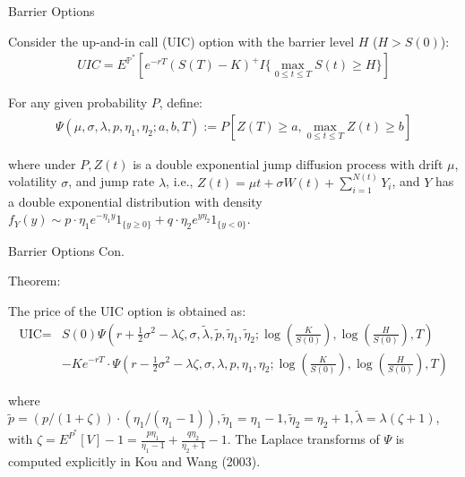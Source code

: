 \documentclass{beamer}
\begin{document}
\begin{frame}{Barrier Options}


    {\footnotesize \footnotesize
    \par Consider the up-and-in call (UIC) option with the barrier level $H$ ($H>S(0)$):
    \vspace{1em}
    \begin{align*}
        UIC = E^{\mathbb{P}^*}[e^{-rT}(S(T) - K)^+I{\{ \max\limits_{0 \leq t \leq T} S(t) \geq H \}}]
    \end{align*}
    \vspace{1em}
    \par For any given probability \( P \), define:
    \vspace{1em}
    \begin{align*}
        \Psi(\mu, \sigma, \lambda, p, \eta_1, \eta_2; a, b, T):= P[Z(T) \geq a, \max_{0 \leq t \leq T} Z(t) \geq b]
    \end{align*}
    \vspace{1em}
    \par where under \( P, Z(t) \) is a double exponential jump diffusion 
    process with drift \( \mu \), volatility \( \sigma \), and jump rate \( \lambda \), i.e., \( Z(t) = \mu t + \sigma W(t) + \sum_{i=1}^{N(t)} Y_i \), 
    and \( Y \) has a double exponential distribution with 
    density \( f_Y(y) \sim p \cdot \eta_1 e^{-\eta_1 y} 1_{\{y \geq 0\}} + q \cdot \eta_2 e^{y \eta_2} 1_{\{y < 0\}} \).
    }
    
    
\end{frame}
\begin{frame}{Barrier Options Con.}

    \par Theorem:
    \vspace{1em}
    {\footnotesize \footnotesize
    
    \par The price of the UIC option is obtained as:
    \vspace{1em}
    \begin{align*}
        \text{UIC} = & S(0) \Psi \left( r + \frac{1}{2} \sigma^2 - \lambda \zeta, \sigma, \tilde{\lambda}, \tilde{p}, \tilde{\eta}_1, \tilde{\eta}_2; \right. 
        \left. \log \left( \frac{K}{S(0)} \right), \log \left( \frac{H}{S(0)} \right), T \right) \\
        & -Ke^{-rT} \cdot \Psi \left( r - \frac{1}{2} \sigma^2 - \lambda \zeta, \sigma, \lambda, p, \eta_1, \eta_2; \right. 
         \left. \log \left( \frac{K}{S(0)} \right), \log \left( \frac{H}{S(0)} \right), T \right)
    \end{align*}
    \vspace{1em}
    \par where \( \tilde{p} = (p/(1 + \zeta)) \cdot (\eta_1 / (\eta_1 - 1)), \tilde{\eta}_1 
    = \eta_1 - 1, \tilde{\eta}_2 = \eta_2 + 1, \tilde{\lambda} = \lambda(\zeta + 1) \), 
    with \(\zeta = E^{P^*}[V] - 1 = \frac{p\eta_{1}}{\eta_{1}-1} + \frac{q\eta_{2}}{\eta_{2}+1} - 1\). 
    The Laplace transforms of \( \Psi \) is computed explicitly in Kou and Wang (2003).
    }
    
\end{frame}
\end{document}
